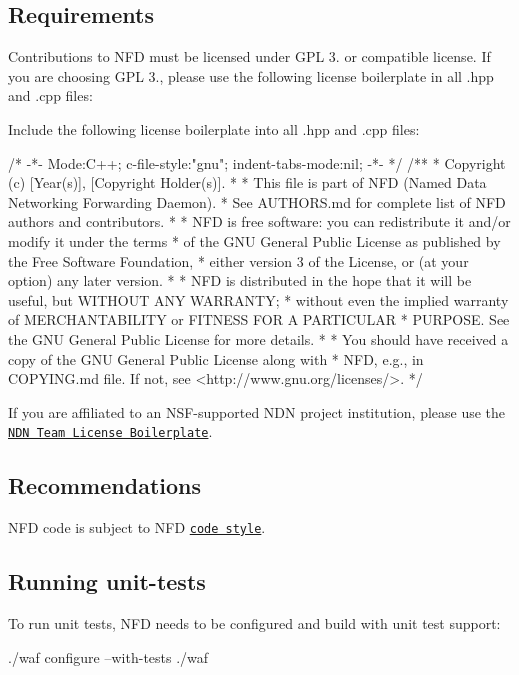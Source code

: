 \subsection*{Requirements }

Contributions to N\+FD must be licensed under G\+PL 3. or compatible license. If you are choosing G\+PL 3., please use the following license boilerplate in all {\ttfamily .hpp} and {\ttfamily .cpp} files\+:

Include the following license boilerplate into all {\ttfamily .hpp} and {\ttfamily .cpp} files\+: \begin{DoxyVerb}/* -*- Mode:C++; c-file-style:"gnu"; indent-tabs-mode:nil; -*- */
/**
 * Copyright (c) [Year(s)],  [Copyright Holder(s)].
 *
 * This file is part of NFD (Named Data Networking Forwarding Daemon).
 * See AUTHORS.md for complete list of NFD authors and contributors.
 *
 * NFD is free software: you can redistribute it and/or modify it under the terms
 * of the GNU General Public License as published by the Free Software Foundation,
 * either version 3 of the License, or (at your option) any later version.
 *
 * NFD is distributed in the hope that it will be useful, but WITHOUT ANY WARRANTY;
 * without even the implied warranty of MERCHANTABILITY or FITNESS FOR A PARTICULAR
 * PURPOSE.  See the GNU General Public License for more details.
 *
 * You should have received a copy of the GNU General Public License along with
 * NFD, e.g., in COPYING.md file.  If not, see <http://www.gnu.org/licenses/>.
 */
\end{DoxyVerb}


If you are affiliated to an N\+S\+F-\/supported N\+DN project institution, please use the \href{http://redmine.named-data.net/projects/nfd/wiki/NDN_Team_License_Boilerplate_(NFD)}{\tt N\+DN Team License Boilerplate}.

\subsection*{Recommendations }

N\+FD code is subject to N\+FD \href{http://redmine.named-data.net/projects/nfd/wiki/CodeStyle}{\tt code style}.

\subsection*{Running unit-\/tests }

To run unit tests, N\+FD needs to be configured and build with unit test support\+: \begin{DoxyVerb}./waf configure --with-tests
./waf
\end{DoxyVerb}


